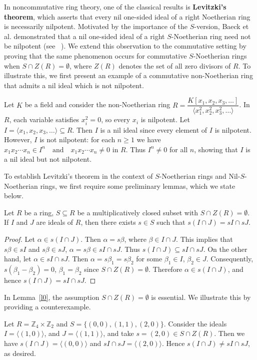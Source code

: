 \documentclass[11pt]{article}
\begin{document}
 In noncommutative ring theory, one of the classical results is 
\textbf{Levitzki's theorem}, which asserts that every nil one-sided 
ideal of a right Noetherian ring is necessarily nilpotent. Motivated by the importance of the $S$-version, Baeck et al. \cite{jw16} demonstrated that a nil one-sided ideal of a right $S$-Noetherian ring need not be nilpotent (see ~\cite[Example 2.5]{jw16}). We extend this observation to the commutative setting by proving that the same phenomenon occurs for commutative $S$-Noetherian rings when $S \cap Z(R) = \emptyset$, where $Z(R)$ denotes the set of all zero divisors of $R$. To illustrate this, we first present an example of a commutative non-Noetherian ring that admits a nil ideal which is not nilpotent.

\begin{eg}
Let $K$ be a field and consider the non-Noetherian  ring $R = \dfrac{K[x_1, x_2, x_3, \dots]}{\langle x_1^2, x_2^2, x_3^2, \dots \rangle}$. In $R$, each variable satisfies $x_i^2 = 0$, so every $x_i$ is nilpotent. 
Let $I = \langle x_1, x_2, x_3, \dots \rangle \subseteq R$. Then $I$ is a nil ideal since every element of $I$ is nilpotent. However, $I$ is not nilpotent: for each $n \geq 1$ we have $x_1 x_2 \cdots x_n \in I^n \quad \text{and} \quad x_1 x_2 \cdots x_n \neq 0 \text{ in } R$. Thus $I^n \neq 0$ for all $n$, showing that $I$ is a nil ideal but not nilpotent. 

\end{eg}
To establish Levitzki's theorem in the context of $S$-Noetherian rings and Nil-$S$-Noetherian rings, we first require some preliminary 
lemmas, which we state below.

\begin{lem}\label{l0}
Let $R$ be a ring, $S \subseteq R$ be a multiplicatively closed subset with $S \cap Z(R) = \emptyset$. If $I$ and $J$ are ideals of $R$, then there exists $s \in S$ such that $s (I \cap J)= sI \cap sJ$.
\end{lem}

\begin{proof}
    Let $\alpha\in s(I\cap J)$. Then $\alpha=s\beta$, where $\beta\in I\cap J$. This implies that $s\beta\in sI$ and $s\beta\in sJ$, $\alpha=s\beta\in sI\cap sJ$. Thus $s(I\cap J)\subseteq sI\cap sJ$. On the other hand, let $\alpha\in sI\cap sJ$. Then $\alpha=s\beta_1=s\beta_2$ for some $\beta_1\in I$, $\beta_2\in J$. Consequently, $s(\beta_1-\beta_2)=0$, $\beta_1=\beta_2$ since $S\cap Z(R)=\emptyset$. Therefore $\alpha\in s(I\cap J)$, and hence $s(I\cap J)=sI\cap sJ$.
\end{proof}
\noindent
In Lemma~\ref{l0}, the assumption $S \cap Z(R) = \emptyset$ is essential. We illustrate this by providing a counterexample.
\begin{eg}
\noindent
 Let \(R=\mathbb{Z}_{4}\times\mathbb{Z}_{2}\) and $S= \{(0,0), (1,1), (2,0)\}$. Consider the ideals $I=\langle(1,0)\rangle$, and  $J=\langle(1,1)\rangle$, and take \(s=(2,0)\in S\cap Z(R)\). Then we have 	$s(I\cap J)= \langle(0,0)\rangle$ and $sI\cap sJ = \langle(2,0)\rangle$. Hence $  s(I\cap J) \neq sI\cap sJ$, as desired.
\end{eg}
\end{document}
